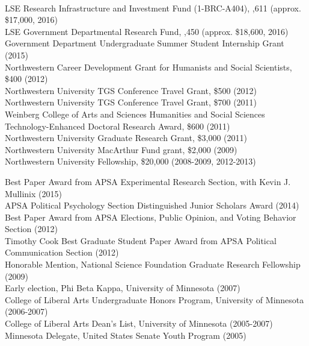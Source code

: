 \documentclass[12pt]{article}
\renewcommand{\section}[1]{\pagebreak[3]%
    \llap{\scshape\smash{\parbox[t]{\marginparwidth}{\raggedright {\color{lg}#1}}}}%
    \vspace{-\baselineskip}\par}
\newcommand{\topic}[1]{\pagebreak[3]\indent {\color{lg}{\footnotesize #1 }}\\}
\newcommand{\entry}[1]{\indent {\color{lg}\guillemotright}\hspace{2pt}#1\vspace{.25em}\\}
\begin{document}
	\topic{Institutional Sources}
	\entry{LSE Research Infrastructure and Investment Fund (1-BRC-A404), \textsterling 11,611 (approx. \$17,000, 2016)}
	\entry{LSE Government Departmental Research Fund, ,450 (approx. \$18,600, 2016)}
	\entry{Government Department Undergraduate Summer Student Internship Grant (2015)}
	\entry{Northwestern Career Development Grant for Humanists and Social Scientists, \$400 (2012)}
	\entry{Northwestern University TGS Conference Travel Grant, \$500 (2012)}
	\entry{Northwestern University TGS Conference Travel Grant, \$700 (2011)}
	\entry{Weinberg College of Arts and Sciences Humanities and Social Sciences Technology-Enhanced Doctoral Research Award, \$600 (2011)}
	\entry{Northwestern University Graduate Research Grant, \$3,000 (2011)}
	\entry{Northwestern University MacArthur Fund grant, \$2,000 (2009)}
	\entry{Northwestern University Fellowship, \$20,000 (2008-2009, 2012-2013)}

\section{Honors \&\\Awards}
	\entry{Best Paper Award from APSA Experimental Research Section, with Kevin J. Mullinix (2015)}
	\entry{APSA Political Psychology Section Distinguished Junior Scholars Award (2014)}
	\entry{Best Paper Award from APSA Elections, Public Opinion, and Voting Behavior Section (2012)}
	\entry{Timothy Cook Best Graduate Student Paper Award from APSA Political Communication Section (2012)}
	\entry{Honorable Mention, National Science Foundation Graduate Research Fellowship (2009)}
	\entry{Early election, Phi Beta Kappa, University of Minnesota (2007)}
	\entry{College of Liberal Arts Undergraduate Honors Program, University of Minnesota (2006-2007)}
	\entry{College of Liberal Arts Dean's List, University of Minnesota (2005-2007)}
	\entry{Minnesota Delegate, United States Senate Youth Program (2005)}
\end{document}
